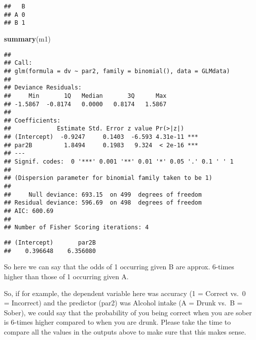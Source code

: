 \documentclass[
]{article}
\newenvironment{Shaded}{\begin{snugshade}}{\end{snugshade}}
\newcommand{\KeywordTok}[1]{\textcolor[rgb]{0.13,0.29,0.53}{\textbf{#1}}}
\newcommand{\NormalTok}[1]{#1}
\newcommand{\OperatorTok}[1]{\textcolor[rgb]{0.81,0.36,0.00}{\textbf{#1}}}
\begin{document}
\begin{Shaded}
\end{Shaded}

\begin{verbatim}
##   B
## A 0
## B 1
\end{verbatim}

\begin{Shaded}
\begin{Highlighting}[]
\KeywordTok{summary}\NormalTok{(m1)}
\end{Highlighting}
\end{Shaded}

\begin{verbatim}
## 
## Call:
## glm(formula = dv ~ par2, family = binomial(), data = GLMdata)
## 
## Deviance Residuals: 
##     Min       1Q   Median       3Q      Max  
## -1.5867  -0.8174   0.0000   0.8174   1.5867  
## 
## Coefficients:
##             Estimate Std. Error z value Pr(>|z|)    
## (Intercept)  -0.9247     0.1403  -6.593 4.31e-11 ***
## par2B         1.8494     0.1983   9.324  < 2e-16 ***
## ---
## Signif. codes:  0 '***' 0.001 '**' 0.01 '*' 0.05 '.' 0.1 ' ' 1
## 
## (Dispersion parameter for binomial family taken to be 1)
## 
##     Null deviance: 693.15  on 499  degrees of freedom
## Residual deviance: 596.69  on 498  degrees of freedom
## AIC: 600.69
## 
## Number of Fisher Scoring iterations: 4
\end{verbatim}

\begin{Shaded}
\end{Shaded}

\begin{verbatim}
## (Intercept)       par2B 
##    0.396648    6.356080
\end{verbatim}

So here we can say that the odds of 1 occurring given B are approx.
6-times higher than those of 1 occurring given A.

So, if for example, the dependent variable here was accuracy (1 =
Correct vs.~0 = Incorrect) and the predictor (par2) was Alcohol intake
(A = Drunk vs.~B = Sober), we could say that the probability of you
being correct when you are sober is 6-times higher compared to when you
are drunk. Please take the time to compare all the values in the outputs
above to make sure that this makes sense.
\end{document}
